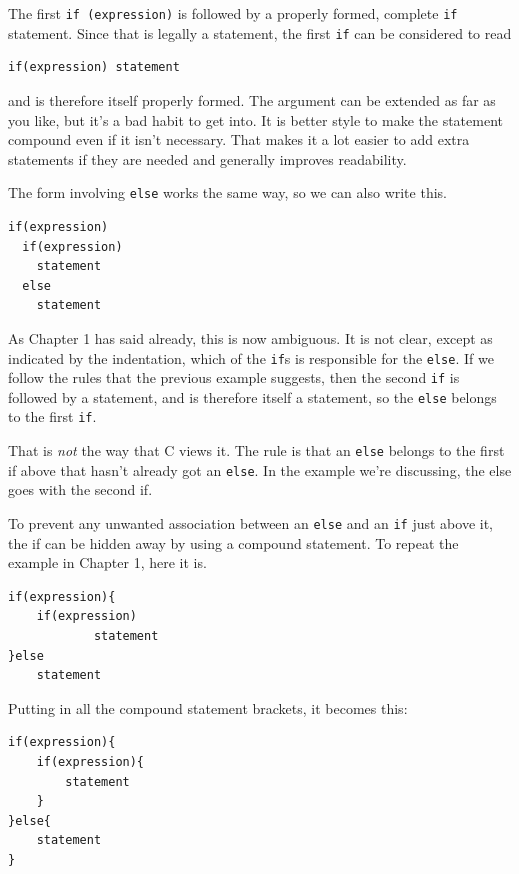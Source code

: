    The first \texttt{if (expression)} is followed by a
    properly formed, complete \texttt{if} statement. Since that is legally
    a statement, the first \texttt{if} can be considered to read


   \begin{Verbatim}
if(expression) statement
\end{Verbatim}

   and is therefore itself properly formed. The argument can be extended as
    far as you like, but it's a bad habit to get into. It is better style to
    make the statement compound even if it isn't necessary. That makes it a
    lot easier to add extra statements if they are needed and generally
    improves readability.


   The form involving \texttt{else} works the same way, so we can also
    write this.


   \begin{Verbatim}
if(expression)
  if(expression)
    statement
  else
    statement
\end{Verbatim}

   As Chapter 1 has said already, this is now ambiguous. It is
    not clear, except as indicated by the indentation, which of the
    \texttt{if}s is responsible for the \texttt{else}. If we follow
    the rules that the previous example suggests, then the second
    \texttt{if} is followed by a statement, and is therefore itself a
    statement, so the \texttt{else} belongs to the first
    \texttt{if}.


   That is \textit{not} the way that C views it. The rule is that an
    \texttt{else} belongs to the first if above that hasn't already got an
    \texttt{else}. In the example we're discussing, the else goes with the
    second if.


   To prevent any unwanted association between an \texttt{else} and an
    \texttt{if} just above it, the if can be hidden away by using a
    compound statement. To repeat the example in Chapter 1, here
    it is.


   \begin{Verbatim}
if(expression){
    if(expression)
            statement
}else
    statement
\end{Verbatim}

   Putting in all the compound statement brackets, it becomes this:


   \begin{Verbatim}
if(expression){
    if(expression){
        statement
    }
}else{
    statement
}
\end{Verbatim}

